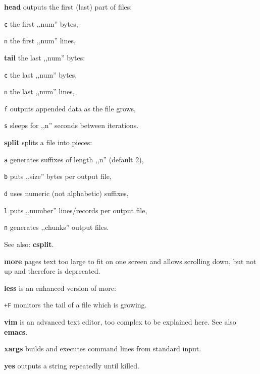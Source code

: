 \begin{enumx}
	\item [\cmdblack] \textbf{head} outputs the first (last) part of files:
	\item [\texttt{c}] the first ,,num'' bytes,
	\item [\texttt{n}] the first ,,num'' lines,
	\item [\cmdblack] \textbf{tail} the last ,,num'' bytes:
	\item [\texttt{c}] the last ,,num'' bytes,
	\item [\texttt{n}] the last ,,num'' lines,
	\item [\texttt{f}] outputs appended data as the file grows,
	\item [\texttt{s}] sleeps for ,,n'' seconds between iterations. 
	\item [\cmdblack] \textbf{split} splits a file into pieces:
	\item [\texttt{a}] generates suffixes of length ,,n'' (default 2),
	\item [\texttt{b}] puts ,,size'' bytes per output file,
	\item [\texttt{d}] uses numeric (not alphabetic) suffixes,
	\item [\texttt{l}] puts ,,number'' lines/records per output file,
	\item [\texttt{n}] generates ,,chunks'' output files.
	\item [\cmdblack] See also: \textbf{csplit}.
\end{enumx}

\begin{enumx}
    \item [\cmd] \textbf{more} pages text too large to fit on one screen and 
    allows scrolling down, but not up and therefore is deprecated.
    \item [\cmd] \textbf{less} is an enhanced version of more:
    \item [\texttt{+F}] monitors the tail of a file which is growing.
\end{enumx}

\begin{enumx}
    \item [\cmd] \textbf{vim} is an advanced text editor, 
    too complex to be explained here.
    See also \textbf{emacs}.
\end{enumx}

\begin{enumx}
	\item [\cmd] \textbf{xargs} builds and executes command lines from standard input.
\end{enumx}

\begin{enumx}
	\item [\cmd] \textbf{yes} outputs a string repeatedly until killed.
\end{enumx}
